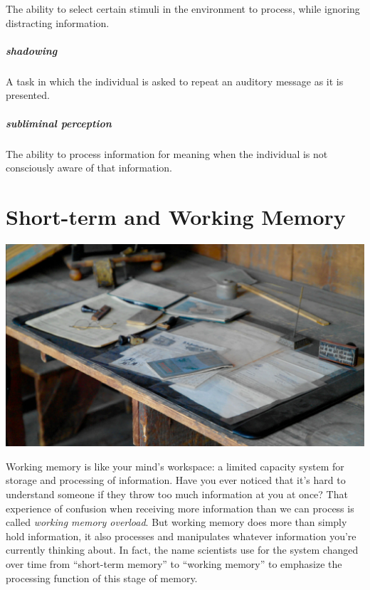 \documentclass[
]{krantz}
\begin{document}
The ability to select certain stimuli in the environment to process, while ignoring distracting information.

\hypertarget{shadowing}{%
\paragraph*{shadowing}\label{shadowing}}

A task in which the individual is asked to repeat an auditory message as it is presented.

\hypertarget{subliminal-perception-1}{%
\paragraph*{subliminal perception}\label{subliminal-perception-1}}

The ability to process information for meaning when the individual is not consciously aware of that information.

\hypertarget{working-memory-chapter}{%
\chapter{Short-term and Working Memory}\label{working-memory-chapter}}

\begin{center}\includegraphics[width=1\linewidth]{images/ch4/fig0} \end{center}

Working memory is like your mind's workspace: a limited capacity system for storage and processing of information. Have you ever noticed that it's hard to understand someone if they throw too much information at you at once? That experience of confusion when receiving more information than we can process is called \emph{working memory overload}. But working memory does more than simply hold information, it also processes and manipulates whatever information you're currently thinking about. In fact, the name scientists use for the system changed over time from ``short-term memory'' to ``working memory'' to emphasize the processing function of this stage of memory.
\end{document}
